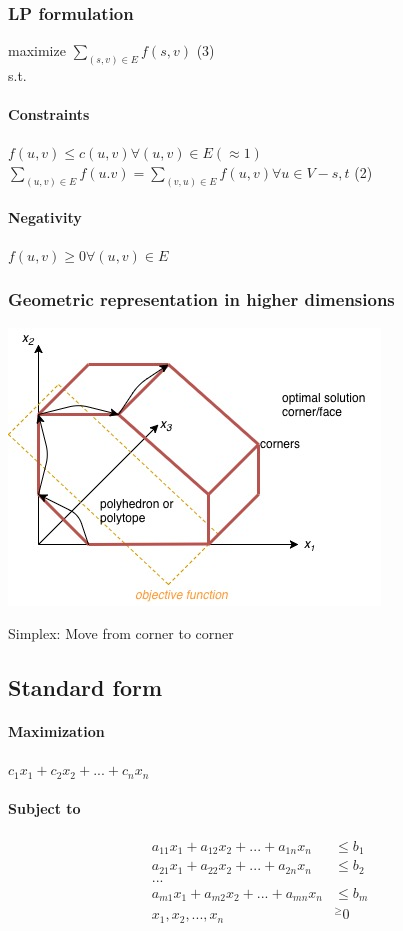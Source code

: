 \subsubsection{LP formulation}
maximize $\sum_{(s,v) \in E}f(s,v)$ (3) \\
s.t.
\paragraph{Constraints} $f(u,v) \leq c(u,v) \forall (u,v) \in E (\approx 1)$ \\
$\sum_{(u,v) \in E}f(u.v) = \sum_{(v,u) \in E}f(u,v) \forall u \in V-{s,t}$ (2)
\paragraph{Negativity} $f(u,v) \geq 0 \forall (u,v) \in E$ 
\subsubsection{Geometric representation in higher dimensions}
\begin{center}
	\includegraphics[scale=0.5]{img/dia2}
\end{center}
Simplex: Move from corner to corner
\subsection{Standard form}
\paragraph{Maximization} $c_1x_1 + c_2x_2 + ... + c_nx_n$
\paragraph{Subject to} \begin{align*}
	a_{11}x_1 + a_{12}x_2  + ... + a_{1n}x_n  &\leq b_1 \\
	a_{21}x_1 + a_{22}x_2  + ... + a_{2n}x_n  &\leq b_2 \\
	... \\
	a_{m1}x_1 + a_{m2}x_2  + ... + a_{mn}x_n  &\leq b_m \\
	x_1,x_2,...,x_n  &^\geq 0 \\
\end{align*}
